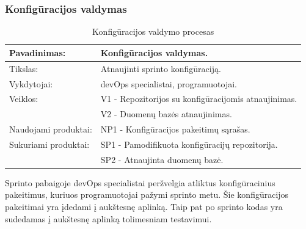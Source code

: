 \documentclass{VUMIFPSkursinis}
\begin{document}
	\subsubsection{Konfigūracijos valdymas}
	\begin{center}
		\begin{table}[ht]
			\caption{Konfigūracijos valdymo procesas}
			\begin{tabular}{ | l | l | }
				\hline
				Pavadinimas:		& Konfigūracijos valdymas.				\\ \hline
				Tikslas: 		& Atnaujinti sprinto konfigūraciją.			\\ \hline
				Vykdytojai:		& devOps specialistai, programuotojai.			\\ \hline
				Veiklos:		& V1 - Repozitorijos su konfigūracijomis atnaujinimas.	\\
							& V2 - Duomenų bazės atnaujinimas.			\\ \hline
				Naudojami produktai:	& NP1 - Konfigūracijos pakeitimų sąrašas.		\\ \hline
				Sukuriami produktai:	& SP1 - Pamodifikuota konfigūracijų repozitorija. 	\\
							& SP2 - Atnaujinta duomenų bazė. 			\\ \hline
			\end{tabular}
		\end{table}
	\end{center}
		Sprinto pabaigoje devOps specialistai peržvelgia atliktus konfigūracinius pakeitimus, kuriuos programuotojai pažymi sprinto metu.
		Šie konfigūracijos pakeitimai yra įdedami į aukštesnę aplinką. Taip pat po sprinto kodas yra sudedamas į aukštesnę aplinką tolimesniam testavimui.
\end{document}
